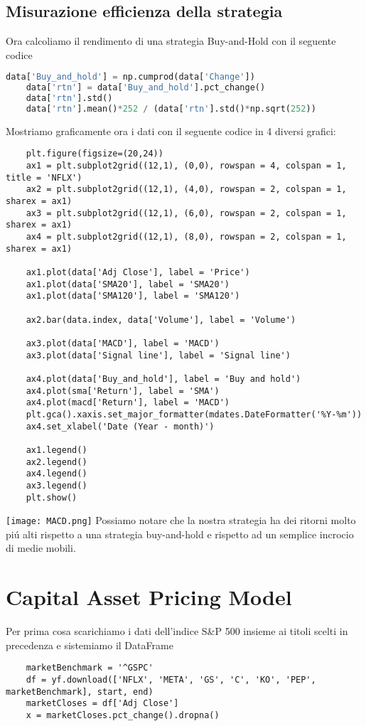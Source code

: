 \documentclass{report}
\begin{document}
\section{Misurazione efficienza della strategia}
Ora calcoliamo il rendimento di una strategia Buy-and-Hold con il seguente codice
\begin{lstlisting}[language=python]
    data['Buy_and_hold'] = np.cumprod(data['Change'])
    data['rtn'] = data['Buy_and_hold'].pct_change()
    data['rtn'].std()
    data['rtn'].mean()*252 / (data['rtn'].std()*np.sqrt(252))
\end{lstlisting}
Mostriamo graficamente ora i dati con il seguente codice in 4 diversi grafici:
\begin{lstlisting}
    plt.figure(figsize=(20,24))
    ax1 = plt.subplot2grid((12,1), (0,0), rowspan = 4, colspan = 1, title = 'NFLX')
    ax2 = plt.subplot2grid((12,1), (4,0), rowspan = 2, colspan = 1, sharex = ax1)
    ax3 = plt.subplot2grid((12,1), (6,0), rowspan = 2, colspan = 1, sharex = ax1)
    ax4 = plt.subplot2grid((12,1), (8,0), rowspan = 2, colspan = 1, sharex = ax1)
    
    ax1.plot(data['Adj Close'], label = 'Price')
    ax1.plot(data['SMA20'], label = 'SMA20')
    ax1.plot(data['SMA120'], label = 'SMA120')
    
    ax2.bar(data.index, data['Volume'], label = 'Volume')
    
    ax3.plot(data['MACD'], label = 'MACD')
    ax3.plot(data['Signal line'], label = 'Signal line')
    
    ax4.plot(data['Buy_and_hold'], label = 'Buy and hold')
    ax4.plot(sma['Return'], label = 'SMA')
    ax4.plot(macd['Return'], label = 'MACD')
    plt.gca().xaxis.set_major_formatter(mdates.DateFormatter('%Y-%m'))
    ax4.set_xlabel('Date (Year - month)')
    
    ax1.legend()
    ax2.legend()
    ax4.legend()
    ax3.legend()
    plt.show()
\end{lstlisting}

\texttt{[image: MACD.png]}
Possiamo notare che la nostra strategia ha dei ritorni molto piú alti rispetto a una strategia buy-and-hold e rispetto ad un semplice incrocio di medie mobili.

\chapter{Capital Asset Pricing Model}
Per prima cosa scarichiamo i dati dell'indice S&P 500 insieme ai titoli scelti in precedenza e sistemiamo il DataFrame
\begin{lstlisting}
    marketBenchmark = '^GSPC'
    df = yf.download(['NFLX', 'META', 'GS', 'C', 'KO', 'PEP', marketBenchmark], start, end)
    marketCloses = df['Adj Close']
    x = marketCloses.pct_change().dropna()
\end{lstlisting}
\end{document}
